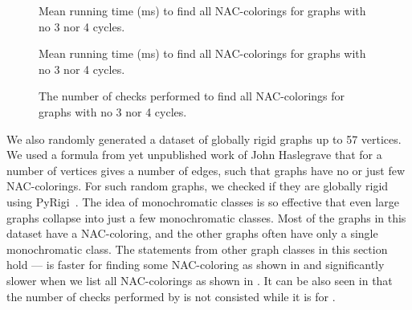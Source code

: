 \begin{figure}[p]
	\centering
	\scalebox{0.5}{}
	\caption[Mean runtime for graphs with no 3 nor 4 cycles (some).]{
		Mean running time (ms) to find all NAC-colorings for graphs with no 3 nor 4 cycles.}%
	\label{fig:graph_count_no_3_nor_4_cycles_first_runtime}
\end{figure}
\begin{figure}[p]
	\centering
	\scalebox{0.5}{}
	\caption[Mean runtime for graphs with no 3 nor 4 cycles (all).]{
		Mean running time (ms) to find all NAC-colorings for graphs with no 3 nor 4 cycles.}%
	\label{fig:graph_count_no_3_nor_4_cycles_all_runtime}
\end{figure}
\begin{figure}[p]
	\centering
	\scalebox{0.5}{}
	\caption[Checks performed for graphs with no 3 nor 4 cycles (all).]{
		The number of checks performed to find all NAC-colorings for graphs with no 3 nor 4 cycles.}%
	\label{fig:graph_count_no_3_nor_4_cycles_all_checks}
\end{figure}


We also randomly generated a dataset of globally rigid graphs
up to 57 vertices.
We used a formula from yet unpublished work of John Haslegrave
that for a number of vertices gives a number of edges,
such that graphs have no or just few NAC-colorings.
For such random graphs, we checked if they are globally rigid using PyRigi~\cite{pyrigi}.
%
The idea of monochromatic classes is so effective
that even large graphs collapse into just a few monochromatic classes.
Most of the graphs in this dataset have a NAC-coloring,
and the other graphs often have only a single monochromatic class.
The statements from other graph classes in this section hold
--- \NaiveCycles{} is faster for finding some NAC-coloring
as shown in 
and significantly slower when we list all NAC-colorings
as shown in .
It can be also seen in 
that the number of checks performed
by \NaiveCycles{} is not consisted while it is for \Subgraphs{}.

